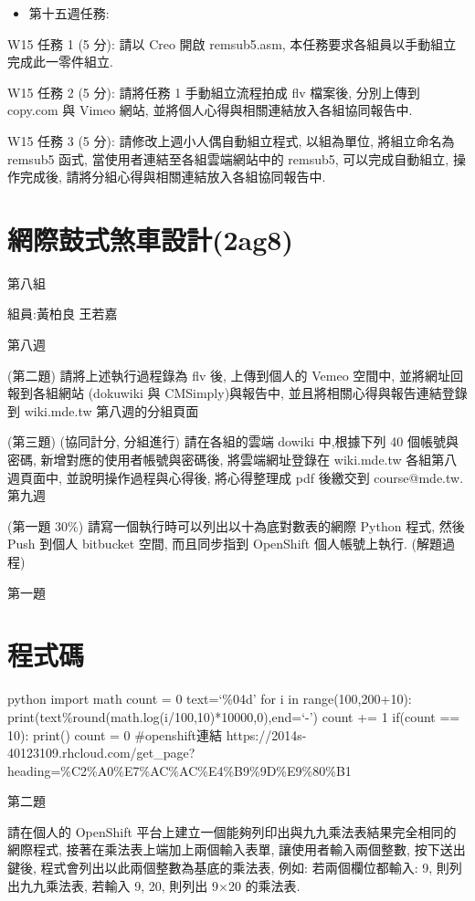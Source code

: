 \documentclass[]{article}
\begin{document}
\begin{itemize}
\itemsep1pt\parskip0pt
\item
  第十五週任務:
\end{itemize}

W15 任務 1 (5 分): 請以 Creo 開啟 remsub5.asm,
本任務要求各組員以手動組立完成此一零件組立.

W15 任務 2 (5 分): 請將任務 1 手動組立流程拍成 flv 檔案後, 分別上傳到
copy.com 與 Vimeo 網站, 並將個人心得與相關連結放入各組協同報告中.

W15 任務 3 (5 分): 請修改上週小人偶自動組立程式, 以組為單位,
將組立命名為 remsub5 函式, 當使用者連結至各組雲端網站中的 remsub5,
可以完成自動組立, 操作完成後, 請將分組心得與相關連結放入各組協同報告中.

\section{網際鼓式煞車設計(2ag8)}\label{ux7db2ux969bux9f13ux5f0fux715eux8ecaux8a2dux8a082ag8}

第八組

組員:黃柏良 王若嘉

第八週

(第二題) 請將上述執行過程錄為 flv 後, 上傳到個人的 Vemeo 空間中,
並將網址回報到各組網站 (dokuwiki 與 CMSimply)與報告中,
並且將相關心得與報告連結登錄到 wiki.mde.tw 第八週的分組頁面

(第三題) (協同計分, 分組進行) 請在各組的雲端 dowiki 中,根據下列 40
個帳號與密碼, 新增對應的使用者帳號與密碼後, 將雲端網址登錄在 wiki.mde.tw
各組第八週頁面中, 並說明操作過程與心得後, 將心得整理成 pdf 後繳交到
course@mde.tw. 第九週

(第一題 30\%) 請寫一個執行時可以列出以十為底對數表的網際 Python 程式,
然後 Push 到個人 bitbucket 空間, 而且同步指到 OpenShift 個人帳號上執行.
(解題過程)

第一題

\section{程式碼}\label{ux7a0bux5f0fux78bc}

python import math count = 0 text=`\%04d' for i in range(100,200+10):
print(text\%round(math.log(i/100,10)*10000,0),end=`-') count += 1
if(count == 10): print() count = 0 \#openshift連結
https://2014s-40123109.rhcloud.com/get\_page?heading=\%C2\%A0\%E7\%AC\%AC\%E4\%B9\%9D\%E9\%80\%B1

第二題

請在個人的 OpenShift
平台上建立一個能夠列印出與九九乘法表結果完全相同的網際程式,
接著在乘法表上端加上兩個輸入表單, 讓使用者輸入兩個整數, 按下送出鍵後,
程式會列出以此兩個整數為基底的乘法表, 例如: 若兩個欄位都輸入: 9,
則列出九九乘法表, 若輸入 9, 20, 則列出 9×20 的乘法表.
\end{document}

